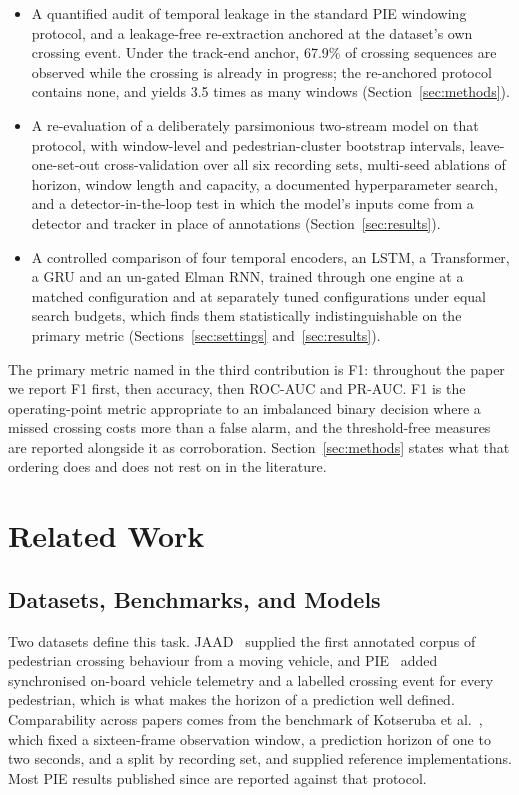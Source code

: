 \documentclass[mti,article,submit,moreauthors]{Definitions/mdpi}
\begin{document}
\begin{itemize}
\item A quantified audit of temporal leakage in the standard PIE windowing protocol, and a leakage-free re-extraction anchored at the dataset's own crossing event. Under the track-end anchor, 67.9\% of crossing sequences are observed while the crossing is already in progress; the re-anchored protocol contains none, and yields 3.5 times as many windows (Section~\ref{sec:methods}).
\item A re-evaluation of a deliberately parsimonious two-stream model on that protocol, with window-level and pedestrian-cluster bootstrap intervals, leave-one-set-out cross-validation over all six recording sets, multi-seed ablations of horizon, window length and capacity, a documented hyperparameter search, and a detector-in-the-loop test in which the model's inputs come from a detector and tracker in place of annotations (Section~\ref{sec:results}).
\item A controlled comparison of four temporal encoders, an LSTM, a Transformer, a GRU and an un-gated Elman RNN, trained through one engine at a matched configuration and at separately tuned configurations under equal search budgets, which finds them statistically indistinguishable on the primary metric (Sections~\ref{sec:settings} and~\ref{sec:results}).
\end{itemize}

The primary metric named in the third contribution is F1: throughout the paper we report F1 first, then accuracy, then ROC-AUC and PR-AUC. F1 is the operating-point metric appropriate to an imbalanced binary decision where a missed crossing costs more than a false alarm, and the threshold-free measures are reported alongside it as corroboration. Section~\ref{sec:methods} states what that ordering does and does not rest on in the literature.

\section{Related Work}
\label{sec:related-work}

\subsection{Datasets, Benchmarks, and Models}

Two datasets define this task. JAAD~\citep{rasouli2017jaad} supplied the first annotated corpus of pedestrian crossing behaviour from a moving vehicle, and PIE~\citep{rasouli2019pie} added synchronised on-board vehicle telemetry and a labelled crossing event for every pedestrian, which is what makes the horizon of a prediction well defined. Comparability across papers comes from the benchmark of Kotseruba et al.~\citep{kotseruba2021benchmark}, which fixed a sixteen-frame observation window, a prediction horizon of one to two seconds, and a split by recording set, and supplied reference implementations. Most PIE results published since are reported against that protocol.
\end{document}

